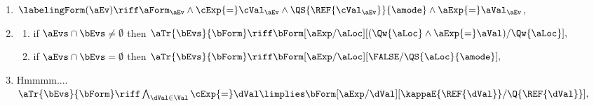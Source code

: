\begin{enumerate}[topsep=0pt,label=(\textsc{w}\arabic*),ref=\textsc{w}\arabic*]
  \setcounter{enumi}{\value{Bkappa}}
\item \label{write-kappa-q-ca-addr}
  \begin{math}
    \labelingForm(\aEv) \riff
    \aForm_\aEv \land
    \cExp{=}\cVal_\aEv
    \land
    \QS{\REF{\cVal_\aEv}}{\amode}
    \land
    \aExp{=}\aVal_\aEv
  \end{math},
\item[] 
  \begin{enumerate}[leftmargin=0pt]
  \item \label{write-tau-dep-q-ca-addr}
    if $\aEvs\cap\bEvs\neq\emptyset$ then
    \begin{math}
      \aTr{\bEvs}{\bForm} \riff 
      \bForm
      [\aExp/\aLoc][(\Qw{\aLoc}\land\aExp{=}\aVal)/\Qw{\aLoc}],
    \end{math}
  \item \label{write-tau-ind-q-ca-addr}
    if $\aEvs\cap\bEvs=\emptyset$ then
    \begin{math}
      \aTr{\bEvs}{\bForm} \riff 
      \bForm
      [\aExp/\aLoc][\FALSE/\QS{\aLoc}{\amode}],
    \end{math}
  \end{enumerate}
\item Hmmmm....
  \begin{math}
    \aTr{\bEvs}{\bForm} \riff
    \textstyle\bigwedge_{\dVal\in\Val}
    \cExp{=}\dVal
    \limplies
    \bForm
    [\aExp/{\dVal}]
    [\kappaE{\REF{\dVal}}/\Q{\REF{\dVal}}],
  \end{math}
\end{enumerate}
\smallskip

